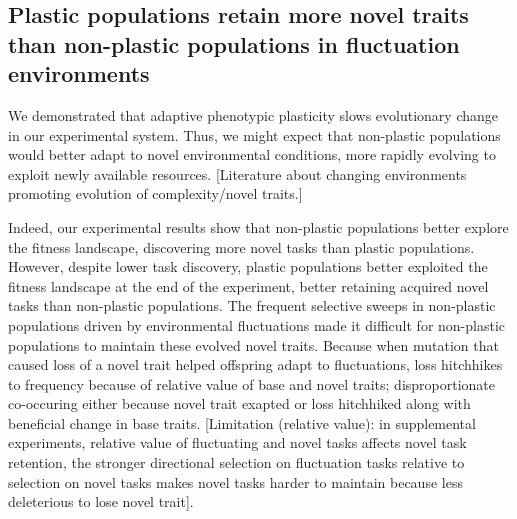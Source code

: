 \subsection{Plastic populations retain more novel traits than non-plastic populations in fluctuation environments}

We demonstrated that adaptive phenotypic plasticity slows evolutionary change in our experimental system. 
Thus, we might expect that non-plastic populations would better adapt to novel environmental conditions, more rapidly evolving to exploit newly available resources.
[Literature about changing environments promoting evolution of complexity/novel traits.]

Indeed, our experimental results show that non-plastic populations better explore the fitness landscape, discovering more novel tasks than plastic populations.
However, despite lower task discovery, plastic populations better exploited the fitness landscape at the end of the experiment, better retaining acquired novel tasks than non-plastic populations. 
The frequent selective sweeps in non-plastic populations driven by environmental fluctuations made it difficult for non-plastic populations to maintain these evolved novel traits.
Because when mutation that caused loss of a novel trait helped offspring adapt to fluctuations, loss hitchhikes to frequency because of relative value of base and novel traits; disproportionate co-occuring either because novel trait exapted or loss hitchhiked along with beneficial change in base traits.
[Limitation (relative value): in supplemental experiments, relative value of fluctuating and novel tasks affects novel task retention, the stronger directional selection on fluctuation tasks relative to selection on novel tasks makes novel tasks harder to maintain because less deleterious to lose novel trait].




